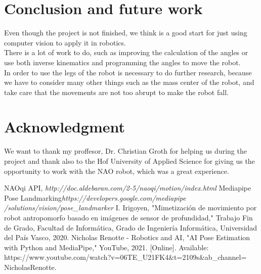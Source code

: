 \documentclass[conference]{IEEEtran}
\begin{document}
\section{Conclusion and future work}
Even though the project is not finished, we think is a good start for just using computer vision to apply it in robotics.
\\
There is a lot of work to do, such as improving the calculation of the angles or use both inverse kinematics and programming the angles to move the robot.
\\
In order to use the legs of the robot is necessary to do further research, because we have to consider many other things such as the mass center of the robot, and take care that the movements are not too abrupt to make the robot fall.

\section*{Acknowledgment}
We want to thank my proffesor, Dr. Christian Groth for helping us during the project and thank also to the Hof University of Applied Science for giving us the opportunity to work with the NAO robot, which was a great experience.



\begin{thebibliography}{00}

 NAOqi API, \textit{http://doc.aldebaran.com/2-5/naoqi/motion/index.html}
 Mediapipe Pose Landmarking\textit{https://developers.google.com/mediapipe
/solutions/vision/pose\_landmarker}
I. Irigoyen, "Mimetización de movimiento por robot antropomorfo basado en imágenes de sensor de profundidad," Trabajo Fin de Grado, Facultad de Informática, Grado de Ingeniería Informática, Universidad del País Vasco, 2020.
 Nicholas Renotte - Robotics and AI, "AI Pose Estimation with Python and MediaPipe," YouTube, 2021. [Online]. Available: https://www.youtube.com/watch?v=06TE\_U21FK4&t=2109s&ab\_channel=
NicholasRenotte.


\end{thebibliography}
\end{document}
